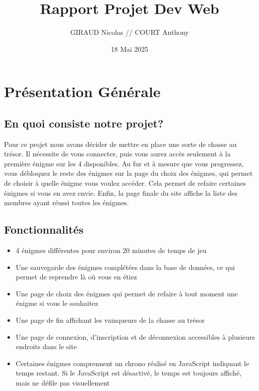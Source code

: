 \documentclass[12pt,a4paper]{article}
\title{Rapport Projet Dev Web} %
\author{GIRAUD Nicolas // COURT Anthony} %
\date{18 Mai 2025} %
\begin{document}
\maketitle
\newpage

\tableofcontents
\newpage

\section{Présentation Générale}
\subsection{En quoi consiste notre projet?}
Pour ce projet nous avons décider de mettre en place une sorte de chasse au trésor. Il nécessite de vous connecter, puis vous aurez accès seulement à la première énigme sur les 4 disponibles. Au fur et à mesure que vous progressez, vous débloquez le reste des énigmes sur la page du choix des énigmes, qui permet de choisir à quelle énigme vous voulez accéder. Cela permet de refaire certaines énigmes si vous en avez envie. Enfin, la page finale du site affiche la liste des membres ayant réussi toutes les énigmes. \\

\subsection{Fonctionnalités}

\begin{itemize}
\item 4 énigmes différentes pour environ 20 minutes de temps de jeu
\item Une sauvegarde des énigmes complétées dans la base de données, ce qui permet de reprendre là où vous en étiez
\item Une page de choix des énigmes qui permet de refaire à tout moment une énigme si vous le souhaitez
\item Une page de fin affichant les vainqueurs de la chasse au trésor
\item Une page de connexion, d'inscription et de déconnexion accessibles à plusieurs endroits dans le site
\item Certaines énigmes comprennent un chrono réalisé en JavaScript indiquant le temps restant. Si le JavaScript est désactivé, le temps est toujours affiché, mais ne défile pas visuellement
\end{itemize}

\newpage
\end{document}
